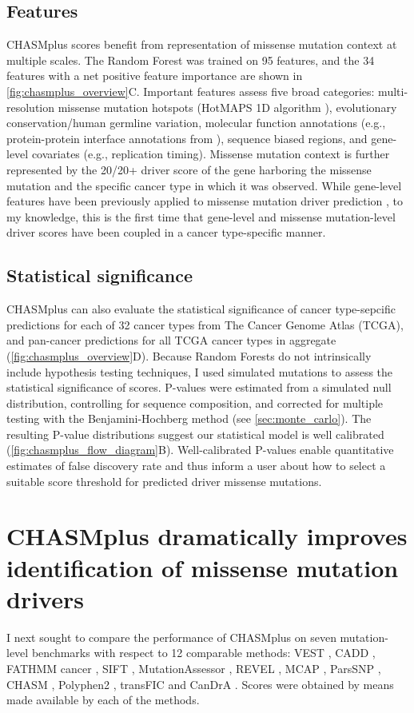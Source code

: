 \subsection{Features}
CHASMplus scores benefit from representation of missense mutation context at multiple scales. The Random Forest was trained on 95 features, and the 34 features with a net positive feature importance are shown in \autoref{fig:chasmplus_overview}C. Important features assess five broad categories: multi-resolution missense mutation hotspots (HotMAPS 1D algorithm \cite{RN60}), evolutionary conservation/human germline variation, molecular function annotations (e.g., protein-protein interface annotations from \cite{RN139}), sequence biased regions, and gene-level covariates (e.g., replication timing). Missense mutation context is further represented by the 20/20+ driver score of the gene harboring the missense mutation and the specific cancer type in which it was observed.  While gene-level features have been previously applied to missense mutation driver prediction \cite{RN35}, to my knowledge, this is the first time that gene-level and missense mutation-level driver scores have been coupled in a cancer type-specific manner.  

\subsection{Statistical significance}
CHASMplus can also evaluate the statistical significance of cancer type-sepcific predictions for each of 32 cancer types from The Cancer Genome Atlas (TCGA), and pan-cancer predictions for all TCGA cancer types in aggregate (\autoref{fig:chasmplus_overview}D). Because Random Forests do not intrinsically include hypothesis testing techniques, I used simulated mutations to assess the statistical significance of scores. P-values were estimated from a simulated null distribution, controlling for sequence composition, and corrected for multiple testing with the Benjamini-Hochberg method (see \autoref{sec:monte_carlo}). The resulting P-value distributions suggest our statistical model is well calibrated (\autoref{fig:chasmplus_flow_diagram}B).  Well-calibrated P-values enable quantitative estimates of false discovery rate and thus inform a user about how to select a suitable score threshold for predicted driver missense mutations.

\section{CHASMplus dramatically improves identification of  missense mutation drivers}
I next sought to compare the performance of CHASMplus on seven mutation-level benchmarks with respect to 12 comparable methods: VEST \cite{RN30}, CADD \cite{RN34}, FATHMM cancer \cite{RN39}, SIFT \cite{RN116}, MutationAssessor \cite{RN38}, REVEL \cite{RN32}, MCAP \cite{RN33}, ParsSNP \cite{RN35}, CHASM \cite{RN29}, Polyphen2 \cite{RN28}, transFIC \cite{RN31} and CanDrA \cite{RN36}. Scores were obtained by means made available by each of the methods. 

